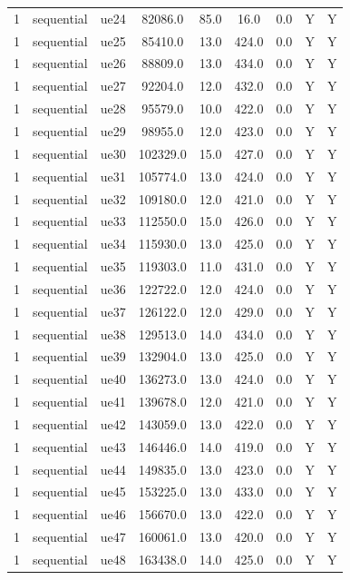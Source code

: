 \begin{table}[ht]
\begin{tabular}{|c|c|c|c|c|c|c|c|c|}
1 & sequential & ue24 & 82086.0 & 85.0 & 16.0 & 0.0 & Y & Y \\
1 & sequential & ue25 & 85410.0 & 13.0 & 424.0 & 0.0 & Y & Y \\
1 & sequential & ue26 & 88809.0 & 13.0 & 434.0 & 0.0 & Y & Y \\
1 & sequential & ue27 & 92204.0 & 12.0 & 432.0 & 0.0 & Y & Y \\
1 & sequential & ue28 & 95579.0 & 10.0 & 422.0 & 0.0 & Y & Y \\
1 & sequential & ue29 & 98955.0 & 12.0 & 423.0 & 0.0 & Y & Y \\
1 & sequential & ue30 & 102329.0 & 15.0 & 427.0 & 0.0 & Y & Y \\
1 & sequential & ue31 & 105774.0 & 13.0 & 424.0 & 0.0 & Y & Y \\
1 & sequential & ue32 & 109180.0 & 12.0 & 421.0 & 0.0 & Y & Y \\
1 & sequential & ue33 & 112550.0 & 15.0 & 426.0 & 0.0 & Y & Y \\
1 & sequential & ue34 & 115930.0 & 13.0 & 425.0 & 0.0 & Y & Y \\
1 & sequential & ue35 & 119303.0 & 11.0 & 431.0 & 0.0 & Y & Y \\
1 & sequential & ue36 & 122722.0 & 12.0 & 424.0 & 0.0 & Y & Y \\
1 & sequential & ue37 & 126122.0 & 12.0 & 429.0 & 0.0 & Y & Y \\
1 & sequential & ue38 & 129513.0 & 14.0 & 434.0 & 0.0 & Y & Y \\
1 & sequential & ue39 & 132904.0 & 13.0 & 425.0 & 0.0 & Y & Y \\
1 & sequential & ue40 & 136273.0 & 13.0 & 424.0 & 0.0 & Y & Y \\
1 & sequential & ue41 & 139678.0 & 12.0 & 421.0 & 0.0 & Y & Y \\
1 & sequential & ue42 & 143059.0 & 13.0 & 422.0 & 0.0 & Y & Y \\
1 & sequential & ue43 & 146446.0 & 14.0 & 419.0 & 0.0 & Y & Y \\
1 & sequential & ue44 & 149835.0 & 13.0 & 423.0 & 0.0 & Y & Y \\
1 & sequential & ue45 & 153225.0 & 13.0 & 433.0 & 0.0 & Y & Y \\
1 & sequential & ue46 & 156670.0 & 13.0 & 422.0 & 0.0 & Y & Y \\
1 & sequential & ue47 & 160061.0 & 13.0 & 420.0 & 0.0 & Y & Y \\
1 & sequential & ue48 & 163438.0 & 14.0 & 425.0 & 0.0 & Y & Y \\

\end{tabular}
\end{table}
